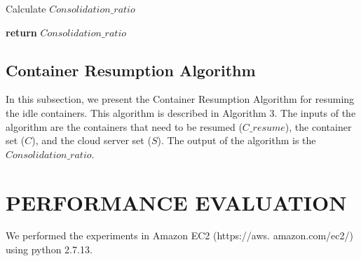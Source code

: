 \documentclass[conference]{IEEEtran}
\begin{document}
\begin{algorithm}
\begin{algorithmic}[1]
\State Calculate \begin{math}Consolidation\_ratio \end{math}
    \EndIf

    \EndWhile  \label{loop}
\State \textbf{return} \begin{math}Consolidation\_ratio \end{math}
\EndProcedure

\end{algorithmic}
\end{algorithm}
\subsection{Container Resumption Algorithm}
In this subsection, we present the Container Resumption
Algorithm for resuming the idle containers. This algorithm
is described in Algorithm 3. The inputs of the algorithm
are the containers that need to be resumed (\begin{math}C\_resume \end{math}), the
container set (\begin{math}C\end{math}), and the cloud server set (\begin{math}S\end{math}). The output of
the algorithm is the \begin{math}Consolidation\_ratio \end{math}.

\section { PERFORMANCE EVALUATION}
We performed the experiments in Amazon EC2 (https://aws.
amazon.com/ec2/) using python 2.7.13.
\end{document}
